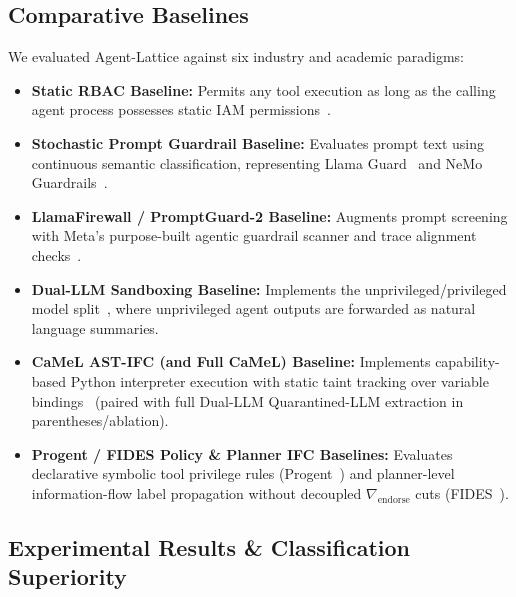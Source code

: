 \documentclass[conference,10pt]{IEEEtran}
\begin{document}
\subsection{Comparative Baselines}
We evaluated Agent-Lattice against six industry and academic paradigms:
\begin{itemize}
    \item \textbf{Static RBAC Baseline:} Permits any tool execution as long as the calling agent process possesses static IAM permissions~\cite{sandhu1996role}.
    \item \textbf{Stochastic Prompt Guardrail Baseline:} Evaluates prompt text using continuous semantic classification, representing Llama Guard~\cite{inan2023llama} and NeMo Guardrails~\cite{rebedea2023nemo}.
    \item \textbf{LlamaFirewall / PromptGuard-2 Baseline:} Augments prompt screening with Meta's purpose-built agentic guardrail scanner and trace alignment checks~\cite{chennabasappa2025llamafirewall}.
    \item \textbf{Dual-LLM Sandboxing Baseline:} Implements the unprivileged/privileged model split~\cite{willison2023dual}, where unprivileged agent outputs are forwarded as natural language summaries.
    \item \textbf{CaMeL AST-IFC (and Full CaMeL) Baseline:} Implements capability-based Python interpreter execution with static taint tracking over variable bindings~\cite{debenedetti2025camel} (paired with full Dual-LLM Quarantined-LLM extraction in parentheses/ablation).
    \item \textbf{Progent / FIDES Policy \& Planner IFC Baselines:} Evaluates declarative symbolic tool privilege rules (Progent~\cite{shi2025progent}) and planner-level information-flow label propagation without decoupled $\nabla_{\text{endorse}}$ cuts (FIDES~\cite{costa2025fides}).
\end{itemize}

\subsection{Experimental Results \& Classification Superiority}
\end{document}
